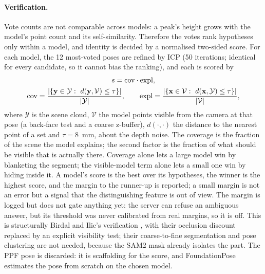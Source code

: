 \paragraph{Verification.} Vote counts are not comparable across models: a peak's height grows with
the model's point count and its self-similarity. Therefore the votes rank hypotheses only within a
model, and identity is decided by a normalised two-sided score. For each model, the 12 most-voted
poses are refined by ICP (50 iterations; identical for every candidate, so it cannot bias the
ranking), and each is scored by
\begin{equation}
\begin{gathered}
s = \mathrm{cov}\cdot\mathrm{expl},\\
\mathrm{cov}=\frac{|\{\vect{y}\in\mathcal{Y}:\ d(\vect{y},\mathcal{V})\le\tau\}|}{|\mathcal{Y}|},\qquad
\mathrm{expl}=\frac{|\{\vect{x}\in\mathcal{V}:\ d(\vect{x},\mathcal{Y})\le\tau\}|}{|\mathcal{V}|},
\end{gathered}
\label{eq:ppf_score}
\end{equation}
where $\mathcal{Y}$ is the scene cloud, $\mathcal{V}$ the model points visible from the camera
at that pose (a back-face test and a coarse z-buffer), $d(\cdot,\cdot)$ the distance to the nearest
point of a set and $\tau=8$~mm, about the depth noise. The coverage is the fraction of the scene the
model explains; the second factor is the fraction of what should be visible that is actually there. Coverage alone lets a large model win by
blanketing the segment; the visible-model term alone lets a small one win by hiding inside it.
A model's score is the best over its hypotheses, the winner is the highest score, and the margin to
the runner-up is reported; a small margin is not an error but a signal that the distinguishing
feature is out of view. The margin is logged but does not gate anything yet: the server can refuse an
ambiguous answer, but its threshold was never calibrated from real margins, so it is off. This is structurally Birdal and Ilic's verification \cite{birdal2015ppf},
with their occlusion discount replaced by an explicit visibility test; their coarse-to-fine
segmentation and pose clustering are not needed, because the SAM2 mask already isolates the part.
The PPF pose is discarded: it is scaffolding for the score, and FoundationPose estimates the pose
from scratch on the chosen model.


